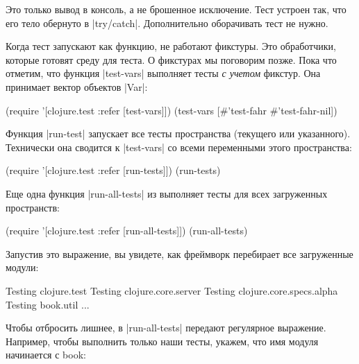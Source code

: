 Это только вывод в консоль, а не брошенное исключение. Тест устроен так, что его
тело обернуто в \spverb|try/catch|. Дополнительно оборачивать тест не нужно.

Когда тест запускают как функцию, не работают фикстуры. Это обработчики, которые
готовят среду для теста. О фикстурах мы поговорим позже. Пока что отметим, что
функция \spverb|test-vars| выполняет тесты \emph{с учетом} фикстур. Она
принимает вектор объектов \spverb|Var|:

\begin{english}
  \begin{clojure}
(require '[clojure.test :refer [test-vars]])
(test-vars [#'test-fahr #'test-fahr-nil])
  \end{clojure}
\end{english}

Функция \spverb|run-test| запускает все тесты пространства (текущего или
указанного). Технически она сводится к \spverb|test-vars| со всеми переменными
этого пространства:

\begin{english}
  \begin{clojure}
(require '[clojure.test :refer [run-tests]])
(run-tests)
  \end{clojure}
\end{english}

Еще одна функция \spverb|run-all-tests| из выполняет тесты для всех загруженных
пространств:

\begin{english}
  \begin{clojure}
(require '[clojure.test :refer [run-all-tests]])
(run-all-tests)
  \end{clojure}
\end{english}

Запустив это выражение, вы увидете, как фреймворк перебирает все загруженные
модули:

\begin{english}
  \begin{text}
Testing clojure.test
Testing clojure.core.server
Testing clojure.core.specs.alpha
Testing book.util
...
  \end{text}
\end{english}

Чтобы отбросить лишнее, в \spverb|run-all-tests| передают регулярное выражение.
Например, чтобы выполнить только наши тесты, укажем, что имя модуля начинается с
book:

\begin{english}
\end{english}

